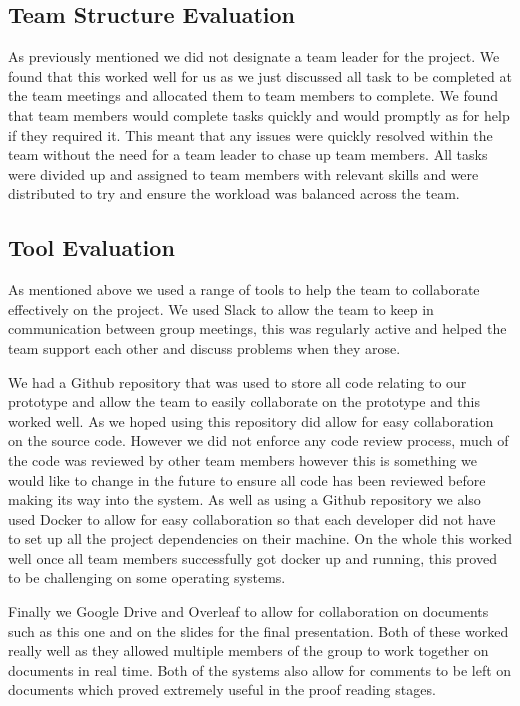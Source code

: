 \subsection{Team Structure Evaluation}

As previously mentioned we did not designate a team leader for the project. We found that this worked well for us as we just discussed all task to be completed at the team meetings and allocated them to team members to complete. We found that team members would complete tasks quickly and would promptly as for help if they required it. This meant that any issues were quickly resolved within the team without the need for a team leader to chase up team members. All tasks were divided up and assigned to team members with relevant skills and were distributed to try and ensure the workload was balanced across the team.

\subsection{Tool Evaluation}

As mentioned above we used a range of tools to help the team to collaborate effectively on the project. We used Slack \cite{slack} to allow the team to keep in communication between group meetings, this was regularly active and helped the team support each other and discuss problems when they arose. 

We had a Github \cite{github} repository that was used to store all code relating to our prototype and allow the team to easily collaborate on the prototype and this worked well. As we hoped using this repository did allow for easy collaboration on the source code. However we did not enforce any code review process, much of the code was reviewed by other team members however this is something we would like to change in the future to ensure all code has been reviewed before making its way into the system. As well as using a Github repository we also used Docker \cite{docker} to allow for easy collaboration so that each developer did not have to set up all the project dependencies on their machine. On the whole this worked well once all team members successfully got docker up and running, this proved to be challenging on some operating systems.

Finally we Google Drive \cite{googledrive} and Overleaf \cite{overleaf} to allow for collaboration on documents such as this one and on the slides for the final presentation. Both of these worked really well as they allowed multiple members of the group to work together on documents in real time. Both of the systems also allow for comments to be left on documents which proved extremely useful in the proof reading stages.

